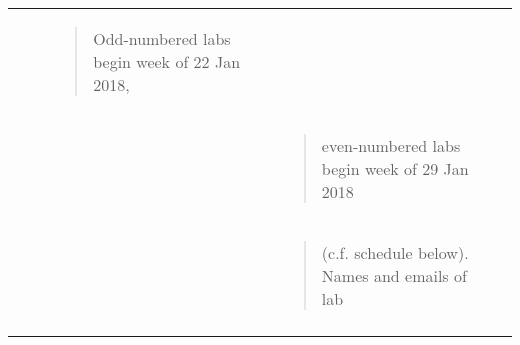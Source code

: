 \begin{longtable}[]{@{}lllll@{}}
\begin{minipage}[t]{0.19\columnwidth}
\strut
\end{minipage} & \begin{minipage}[t]{0.19\columnwidth}\raggedright\strut
\strut
\end{minipage} & \begin{minipage}[t]{0.19\columnwidth}\raggedright\strut
\begin{quote}
Odd-numbered labs begin week of 22 Jan 2018,
\end{quote}\strut
\end{minipage}\tabularnewline
\begin{minipage}[t]{0.19\columnwidth}\raggedright\strut
\strut
\end{minipage} & \begin{minipage}[t]{0.19\columnwidth}\raggedright\strut
\strut
\end{minipage} & \begin{minipage}[t]{0.19\columnwidth}\raggedright\strut
\strut
\end{minipage} & \begin{minipage}[t]{0.19\columnwidth}\raggedright\strut
\begin{quote}
even-numbered labs begin week of 29 Jan 2018
\end{quote}\strut
\end{minipage}\tabularnewline
\begin{minipage}[t]{0.19\columnwidth}\raggedright\strut
\strut
\end{minipage} & \begin{minipage}[t]{0.19\columnwidth}\raggedright\strut
\strut
\end{minipage} & \begin{minipage}[t]{0.19\columnwidth}\raggedright\strut
\strut
\end{minipage} & \begin{minipage}[t]{0.19\columnwidth}\raggedright\strut
\begin{quote}
(c.f. schedule below). Names and emails of lab
\end{quote}\strut
\end{minipage}\tabularnewline
\begin{minipage}[t]{0.19\columnwidth}\raggedright\strut
\strut
\end{minipage} & \begin{minipage}[t]{0.19\columnwidth}\raggedright\strut
\strut
\end{minipage} & \begin{minipage}[t]{0.19\columnwidth}\raggedright\strut
\strut
\end{minipage} & \begin{minipage}[t]{0.19\columnwidth}\raggedright\strut

\end{minipage}
\end{longtable}
